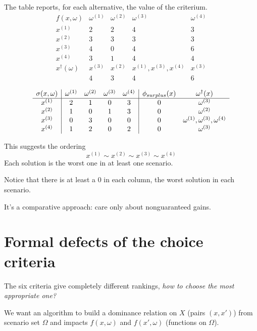 
The table reports, for each alternative, the value of the criterium.
$$
\begin{array}{c|cccc}
	f(x,\omega) & \omega^{(1)} & \omega^{(2)} & \omega^{(3)} & \omega^{(4)} \\
	\hline
	x^{(1)} & 2 & 2 & 4 & 3 \\
	x^{(2)} & 3 & 3 & 3 & 3 \\
	x^{(3)} & 4 & 0 & 4 & 6 \\
	x^{(4)} & 3 & 1 & 4 & 4 \\
	\hline
	x^\dag (\omega) & x^{(3)} & x^{(2)} & x^{(1)}, x^{(3)}, x^{(4)} & x^{(3)} \\
	& 4 & 3 & 4 & 6 \\
\end{array}
$$
$$
\begin{array}{c|cccc | c c}
	\sigma (x,\omega) & \omega^{(1)} & \omega^{(2)} & \omega^{(3)} & \omega^{(4)} & \phi_{surplus} (x) & \omega^\dag (x) \\
	\hline
	x^{(1)} & 2 & 1 & 0 & 3 & 0 & \omega^{(3)} \\
	x^{(2)} & 1 & 0 & 1 & 3 & 0 & \omega^{(2)} \\
	x^{(3)} & 0 & 3 & 0 & 0 & 0 & \omega^{(1)}, \omega^{(3)}, \omega^{(4)} \\
	x^{(4)} & 1 & 2 & 0 & 2 & 0 &\omega^{(3)} \\
\end{array}
$$

This suggests the ordering
$$ x^{(1)} \sim x^{(2)} \sim x^{(3)} \sim x^{(4)} $$
Each solution is the worst one in at least one scenario.

Notice that there is at least a 0 in each column, the worst solution in each scenario.

It's a comparative approach: care only about nonguaranteed gains.

\section{Formal defects of the choice criteria}
\label{sec:formaldefects}

The six criteria give completely different rankings, \textit{how to choose the most appropriate one?}

We want an algorithm to build a dominance relation on $X$ (pairs $(x, x')$) from scenario set $\Omega$ and impacts $f(x, \omega)$ and $f(x', \omega)$ (functions on $\Omega$).

